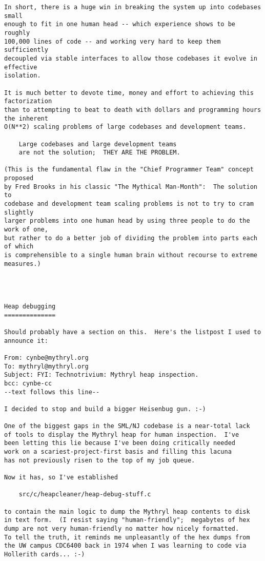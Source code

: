 \begin{verbatim}
In short, there is a huge win in breaking the system up into codebases small
enough to fit in one human head -- which experience shows to be roughly
100,000 lines of code -- and working very hard to keep them sufficiently
decoupled via stable interfaces to allow those codebases it evolve in effective
isolation.

It is much better to devote time, money and effort to achieving this factorization
than to attempting to beat to death with dollars and programming hours the inherent
O(N**2) scaling problems of large codebases and development teams.

    Large codebases and large development teams
    are not the solution;  THEY ARE THE PROBLEM.

(This is the fundamental flaw in the "Chief Programmer Team" concept proposed
by Fred Brooks in his classic "The Mythical Man-Month":  The solution to 
codebase and development team scaling problems is not to try to cram slightly
larger problems into one human head by using three people to do the work of one,
but rather to do a better job of dividing the problem into parts each of which
is comprehensible to a single human brain without recourse to extreme measures.)




Heap debugging
==============

Should probably have a section on this.  Here's the listpost I used to announce it:

From: cynbe@mythryl.org 
To: mythryl@mythryl.org 
Subject: FYI: Technotrivium: Mythryl heap inspection. 
bcc: cynbe-cc 
--text follows this line-- 
 
I decided to stop and build a bigger Heisenbug gun. :-) 
 
One of the biggest gaps in the SML/NJ codebase is a near-total lack 
of tools to display the Mythryl heap for human inspection.  I've 
been letting this lie because I've been doing critically needed 
work on a scariest-project-first basis and filling this lacuna 
has not previously risen to the top of my job queue. 
 
Now it has, so I've established 
 
    src/c/heapcleaner/heap-debug-stuff.c 
 
to contain the main logic to dump the Mythryl heap contents to disk 
in text form.  (I resist saying "human-friendly";  megabytes of hex 
dump are not very human-friendly no matter how nicely formatted. 
To tell the truth, it reminds me unpleasantly of the hex dumps from 
the UW campus CDC6400 back in 1974 when I was learning to code via 
Hollerith cards... :-) 
 

\end{verbatim}
